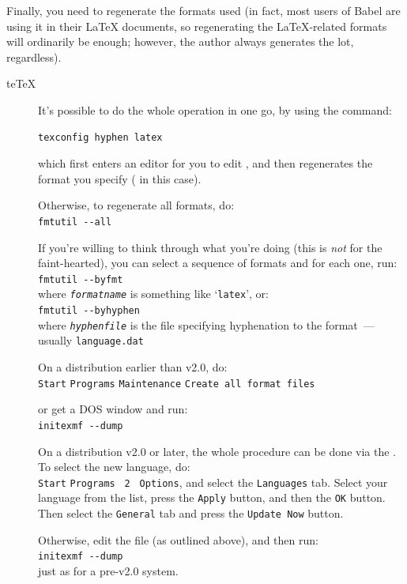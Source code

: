 Finally, you need to regenerate the formats used (in fact, most users
of Babel are using it in their \LaTeX{} documents, so regenerating the
\LaTeX{}-related formats will ordinarily be enough; however, the
author always generates the lot, regardless).
\begin{description}
\item[te\TeX{}]It's possible to do the whole operation in one go, by
  using the  command:
\begin{verbatim}
texconfig hyphen latex
\end{verbatim}
  which first enters an editor for you to edit ,
  and then regenerates the format you specify ( in
  this case).

  Otherwise, to regenerate all formats, do: \\
  \texttt{fmtutil -\relax-all}
  
  If you're willing to think through what you're doing (this is
  \emph{not} for the faint-hearted), you can select a sequence of
  formats and for each one, run: \\
  \texttt{fmtutil -\relax-byfmt }\\
  where \emph{\texttt{formatname}} is something like `\texttt{latex}',
  or: \\
  \texttt{fmtutil -\relax-byhyphen }\\
  where \emph{\texttt{hyphenfile}} is the file specifying hyphenation
  to the format~--- usually \texttt{language.dat}
\item[\miktex{}] On a \Package{\miktex{}} distribution earlier than v2.0, do: \\
  \texttt{Start}\arrowhyph{}%
  \texttt{Programs}\arrowhyph{}%
  \texttt{\miktex{}}\arrowhyph{}%
  \texttt{Maintenance}\arrowhyph{}%
  \texttt{Create all format files}

  or get a DOS window and run:\\
  \texttt{initexmf -\relax-dump}
  
  On a \Package{\miktex{}} distribution v2.0 or later, the whole
  procedure can be done via the .  To select the new
  language, do:\\
  \texttt{Start}\arrowhyph{}%
  \texttt{Programs}\arrowhyph{}%
  \texttt{\miktex{} 2}\arrowhyph{}%
  \texttt{\miktex{} Options}, and select the \texttt{Languages} tab.
  Select your language from the list, press the \texttt{Apply} button,
  and then the \texttt{OK} button.  Then select the \texttt{General}
  tab and press the \texttt{Update Now} button.
  
  Otherwise, edit the  file (as outlined above),
  and then run:\\
  \texttt{initexmf -\relax-dump}\\
  just as for a pre-v2.0 system.
\end{description}

